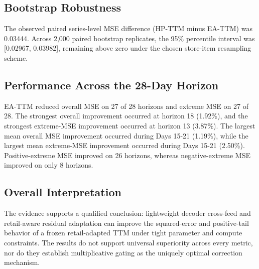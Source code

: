 \subsection{Bootstrap Robustness}
The observed paired series-level MSE difference (HP-TTM minus EA-TTM) was 0.03444. Across 2,000 paired bootstrap replicates, the 95\% percentile interval was [0.02967, 0.03982], remaining above zero under the chosen store-item resampling scheme.

\subsection{Performance Across the 28-Day Horizon}
EA-TTM reduced overall MSE on 27 of 28 horizons and extreme MSE on 27 of 28. The strongest overall improvement occurred at horizon 18 (1.92\%), and the strongest extreme-MSE improvement occurred at horizon 13 (3.87\%). The largest mean overall MSE improvement occurred during Days 15-21 (1.19\%), while the largest mean extreme-MSE improvement occurred during Days 15-21 (2.50\%). Positive-extreme MSE improved on 26 horizons, whereas negative-extreme MSE improved on only 8 horizons.

\subsection{Overall Interpretation}
The evidence supports a qualified conclusion: lightweight decoder cross-feed and retail-aware residual adaptation can improve the squared-error and positive-tail behavior of a frozen retail-adapted TTM under tight parameter and compute constraints. The results do not support universal superiority across every metric, nor do they establish multiplicative gating as the uniquely optimal correction mechanism.
